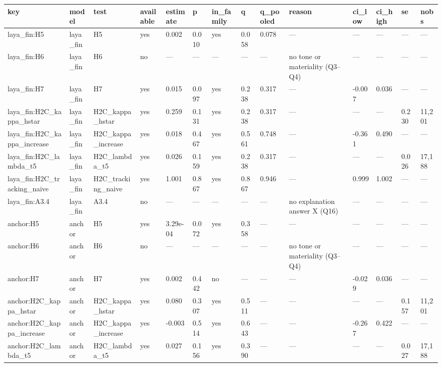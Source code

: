 \begin{tabular}{llllllllllllll}
\toprule
key & model & test & available & estimate & p & in\_family & q & q\_pooled & reason & ci\_low & ci\_high & se & nobs \\
\midrule
laya\_fin:H5 & laya\_fin & H5 & yes & 0.002 & 0.010 & yes & 0.058 & 0.078 & — & — & — & — & — \\
laya\_fin:H6 & laya\_fin & H6 & no & — & — & — & — & — & no tone or materiality (Q3–Q4) & — & — & — & — \\
laya\_fin:H7 & laya\_fin & H7 & yes & 0.015 & 0.097 & yes & 0.238 & 0.317 & — & -0.007 & 0.036 & — & — \\
laya\_fin:H2C\_kappa\_hstar & laya\_fin & H2C\_kappa\_hstar & yes & 0.259 & 0.131 & yes & 0.238 & 0.317 & — & — & — & 0.230 & 11,201 \\
laya\_fin:H2C\_kappa\_increase & laya\_fin & H2C\_kappa\_increase & yes & 0.018 & 0.467 & yes & 0.561 & 0.748 & — & -0.361 & 0.490 & — & — \\
laya\_fin:H2C\_lambda\_t5 & laya\_fin & H2C\_lambda\_t5 & yes & 0.026 & 0.159 & yes & 0.238 & 0.317 & — & — & — & 0.026 & 17,188 \\
laya\_fin:H2C\_tracking\_naive & laya\_fin & H2C\_tracking\_naive & yes & 1.001 & 0.867 & yes & 0.867 & 0.946 & — & 0.999 & 1.002 & — & — \\
laya\_fin:A3.4 & laya\_fin & A3.4 & no & — & — & — & — & — & no explanation answer X (Q16) & — & — & — & — \\
anchor:H5 & anchor & H5 & yes & 3.29e-04 & 0.072 & yes & 0.358 & — & — & — & — & — & — \\
anchor:H6 & anchor & H6 & no & — & — & — & — & — & no tone or materiality (Q3–Q4) & — & — & — & — \\
anchor:H7 & anchor & H7 & yes & 0.002 & 0.442 & no & — & — & — & -0.029 & 0.036 & — & — \\
anchor:H2C\_kappa\_hstar & anchor & H2C\_kappa\_hstar & yes & 0.080 & 0.307 & yes & 0.511 & — & — & — & — & 0.157 & 11,201 \\
anchor:H2C\_kappa\_increase & anchor & H2C\_kappa\_increase & yes & -0.003 & 0.514 & yes & 0.643 & — & — & -0.267 & 0.422 & — & — \\
anchor:H2C\_lambda\_t5 & anchor & H2C\_lambda\_t5 & yes & 0.027 & 0.156 & yes & 0.390 & — & — & — & — & 0.027 & 17,188 \\

\end{tabular}
